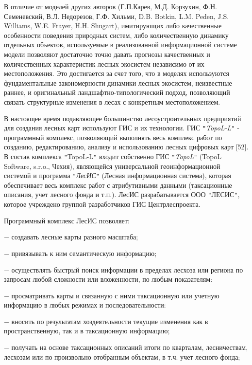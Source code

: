 \documentclass{article}
\begin{document}
В отличие от моделей других авторов (Г.П.Карев, 
М.Д. Корзухин, Ф.Н. Семеневский, В.Л. Недорезов, 
Г.Ф. Хильми, D.B. Botkin, L.M. Peden, J.S. Williams, W.E. Frayer, H.H. 
Shugart), имитирующих либо качественные особенности 
поведения природных систем, либо количественную 
динамику отдельных объектов, используемые 
в реализованной информационной системе модели 
позволяют достаточно точно давать прогнозы 
качественных и количественных характеристик 
лесных экосистем независимо от их местоположения. 
Это достигается за счет того, что в моделях 
используются фундаментальные закономерности 
динамики лесных экосистем, неизвестные раннее, 
и оригинальный ландшафтно-типологический подход, 
позволяющий связать структурные изменения 
в лесах с конкретным местоположением.

В настоящее время подавляющее большинство 
лесоустроительных предприятий для создания 
лесных карт используют ГИС и их технологии. 
ГИС \texttt{"}\textit{TopoL-L}\texttt{"} - программный комплекс, 
позволяющий выполнять весь комплекс работ 
по созданию, редактированию, анализу и использованию 
лесных цифровых карт [52]. В состав  комплекса 
 \texttt{"}TopoL-L\texttt{"}  входит  собственно ГИС \texttt{"}\textit{TopoL}\texttt{"} 
(TopoL Software, s.r.o., Чехия), являющейся универсальной 
геоинформационной системой и программа \texttt{"}\textit{ЛесИС}\texttt{"} 
(Лесная информационная система), которая обеспечивает 
весь комплекс работ с атрибутивными данными 
(таксационные описания, учет лесного фонда 
и т.п.). ЛесИС разрабатывается ООО \texttt{"}ЛЕСИС\texttt{"}, 
которое учреждено группой разработчиков ГИС 
Центрлеспроекта.

Программный комплекс ЛесИС позволяет:

\ensuremath{-} создавать лесные карты разного масштаба;

\ensuremath{-} привязывать к ним семантическую информацию;

\ensuremath{-} осуществлять быстрый поиск информации 
в пределах лесхоза или региона по запросам 
любой сложности или вложенности, по любым показателям:

\ensuremath{-} просматривать карты и связанную с ними 
таксационную или учетную информацию в любых 
режимах и последовательности:

\ensuremath{-} вносить по результатам хоздеятельности 
текущие изменения как в пространственную, так 
и в таксационную информацию;

\ensuremath{-} получать на основе таксационных описаний 
итоги по кварталам, лесничествам, лесхозам 
или по произвольно отобранным объектам, в т.ч. 
учет лесного фонда;
\end{document}
